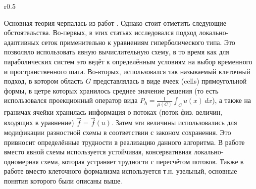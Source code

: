 \begin{wrapfigure}{r}{0.5\textwidth}
    \begin{center}
    \end{center}
\end{wrapfigure}
Основная теория черпалась из работ \cite{berger1982adaptive, berger1989local, deiterding2011block}.
Однако стоит отметить следующие обстоятельства.
Во-первых, в этих статьях исследовался подход локально-адаптивных сеток применительно к уравнениям гиперболического типа.
Это позволяло использовать явную вычислительную схему, в то время как для параболических систем это ведёт к определённым условиям на выбор временного и пространственного шага.
Во-вторых, использовался так называемый клеточный подход, в котором область $G$ представлялась в виде ячеек (cells) прямоугольной формы, в цетре которых хранилось среднее значение решения (то есть использовался проекционный оператор вида $P_h = \frac{1}{\mu(C)} \int_{C} u(x)\, dx$), а также на граничах ячейки хранилась информация о потоках (поток физ. величин, входящих в уравнение) $\vec f = \vec f(u)$.
Затем эти величины использовались для модификации разностной схемы в соответствии с законом сохранения.
Это привносит определённые трудности в реализацию данного алгоритма.
В работе вместо явной схемы используется устойчивая, консервативная локально-одномерная схема, которая устраняет трудности с пересчётом потоков.
Также в работе вместо клеточного формализма используется т.н. узельный, основные понятия которого были описаны выше.